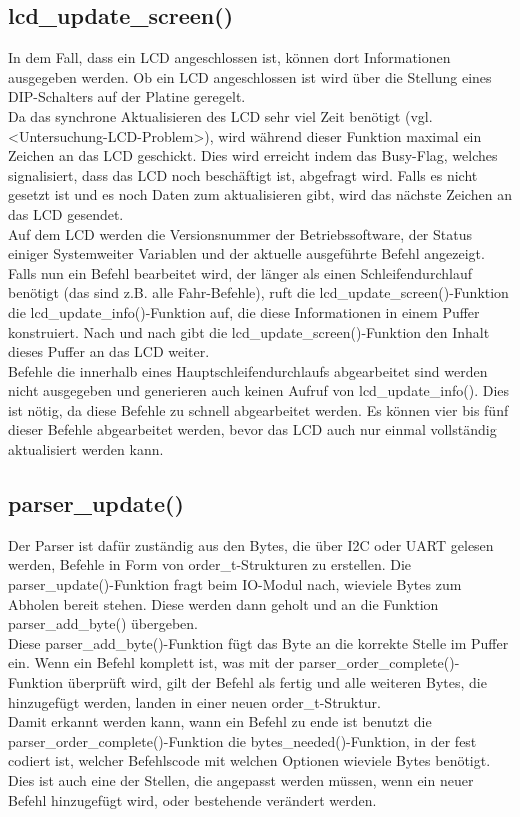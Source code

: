 \subsection{lcd\_update\_screen()}
In dem Fall, dass ein LCD angeschlossen ist, können dort Informationen ausgegeben werden. Ob ein LCD
angeschlossen ist wird über die Stellung eines DIP-Schalters auf der Platine geregelt.\\
Da das synchrone Aktualisieren des LCD sehr viel Zeit benötigt (vgl. <Untersuchung-LCD-Problem>), wird
während dieser Funktion maximal ein Zeichen an das LCD geschickt. Dies wird erreicht indem das Busy-Flag,
welches signalisiert, dass das LCD noch beschäftigt ist, abgefragt wird. Falls es nicht gesetzt ist und
es noch Daten zum aktualisieren gibt, wird das nächste Zeichen an das LCD gesendet.\\
Auf dem LCD werden die Versionsnummer der Betriebssoftware, der Status einiger Systemweiter Variablen und
der aktuelle ausgeführte Befehl angezeigt. Falls nun ein Befehl bearbeitet wird, der länger als einen
Schleifendurchlauf benötigt (das sind z.B. alle Fahr-Befehle), ruft die lcd\_\-update\_\-screen()-Funktion
die lcd\_\-update\_\-info()-Funktion auf, die diese Informationen in einem Puffer konstruiert. Nach und nach
gibt die lcd\_\-update\_\-screen()-Funktion den Inhalt dieses Puffer an das LCD weiter.\\
Befehle die innerhalb eines Hauptschleifendurchlaufs abgearbeitet sind werden nicht ausgegeben und
generieren auch keinen Aufruf von lcd\_\-update\_\-info(). Dies ist nötig, da diese Befehle zu schnell abgearbeitet
werden. Es können vier bis fünf dieser Befehle abgearbeitet werden, bevor das LCD auch nur einmal vollständig
aktualisiert werden kann.
\subsection{parser\_update()}
Der Parser ist dafür zuständig aus den Bytes, die über I2C oder UART gelesen werden, Befehle in Form von
order\_t-Strukturen zu erstellen. Die parser\_\-update()-Funktion fragt beim IO-Modul nach, wieviele Bytes
zum Abholen bereit stehen. Diese werden dann geholt und an die Funktion parser\_\-add\_\-byte() übergeben.\\
Diese parser\_\-add\_\-byte()-Funktion fügt das Byte an die korrekte Stelle im Puffer ein. Wenn ein Befehl
komplett ist, was mit der parser\_\-order\_\-complete()-Funktion überprüft wird, gilt der Befehl als fertig und
alle weiteren Bytes, die hinzugefügt werden, landen in einer neuen order\_t-Struktur.\\
Damit erkannt werden kann, wann ein Befehl zu ende ist benutzt die parser\_\-order\_\-complete()-Funktion
die bytes\_\-needed()-Funktion, in der fest codiert ist, welcher Befehlscode mit welchen Optionen wieviele
Bytes benötigt. Dies ist auch eine der Stellen, die angepasst werden müssen, wenn ein neuer Befehl hinzugefügt
wird, oder bestehende verändert werden.
